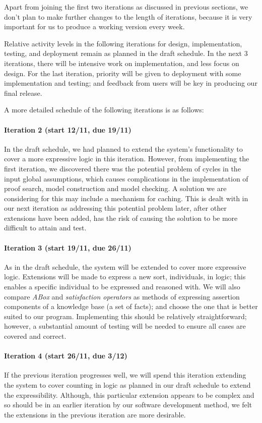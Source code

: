 Apart from joining the first two iterations as discussed in previous sections, we don't plan to make further changes to the length of iterations, because it is very important for us to produce a working version every week.

Relative activity levels in the following iterations for design, implementation, testing, and deployment remain as planned in the draft schedule. In the next 3 iterations, there will be intensive work on implementation, and less focus on design. For the last iteration, priority will be given to deployment with some implementation and testing; and  feedback from users will be key in producing our final release.

A more detailed schedule of the following iterations is as follows:
\paragraph{Iteration 2 (start 12/11, due 19/11)} In the draft schedule, we had planned to extend the system's functionality to cover a more expressive logic in this iteration. However, from implementing the first iteration, we discovered there was the potential problem of cycles in the input global assumptions, which causes complications in the implementation of proof search, model construction and model checking. A solution we are considering for this may include a mechanism for caching. This is dealt with in our next iteration as addressing this potential problem later, after other extensions have been added, has the risk of causing the solution to be more difficult to attain and test.
\paragraph{Iteration 3 (start 19/11, due 26/11)} As in the draft schedule, the system will be extended to cover more expressive logic. Extensions will be made to express a new sort, individuals, in logic; this enables a specific individual to be expressed and reasoned with. We will also compare \emph{ABox} and \emph{satisfaction operators} as methods of expressing assertion components of a knowledge base (a set of facts); and choose the one that is better suited to our program. Implementing this should be relatively straightforward; however, a substantial amount of testing will be needed to ensure all cases are covered and correct.
\paragraph{Iteration 4 (start 26/11, due 3/12)} If the previous iteration progresses well, we will spend this iteration extending the system to cover counting in logic as planned in our draft schedule to extend the expressibility. Although, this particular extension appears to be complex and so should be in an earlier iteration by our software development method, we felt the extensions in the previous iteration are more desirable.
